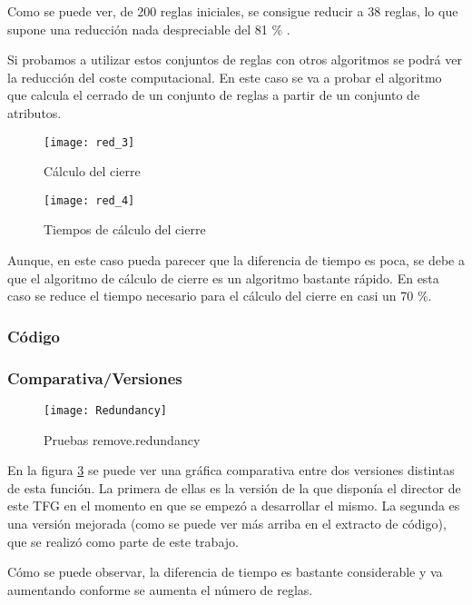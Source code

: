 Como se puede ver, de 200 reglas iniciales, se consigue reducir a 38 reglas, lo que supone una reducci\'on nada despreciable del 81 \% .

Si probamos a utilizar estos conjuntos de reglas con otros algoritmos se podr\'a ver la reducci\'on del coste computacional. En este caso se va a probar el algoritmo que calcula el cerrado de un conjunto de reglas a partir de un conjunto de atributos.

\begin{figure}[H]
    \centering
    \texttt{[image: red\_3]}
    \caption{C\'alculo del cierre}
    \label{fig:red_3}
\end{figure}

\begin{figure}[H]
    \centering
    \texttt{[image: red\_4]}
    \caption{Tiempos de c\'alculo del cierre}
    \label{fig:red_4}
\end{figure}

Aunque, en este caso pueda parecer que la diferencia de tiempo es poca, se debe a que el algoritmo de c\'alculo de cierre es un algoritmo bastante r\'apido. En esta caso se reduce el tiempo necesario para el c\'alculo del cierre en casi un 70 \%.

\newpage
\subsubsection{C\'odigo} 

\newpage
 
\subsubsection{Comparativa/Versiones} 
\begin{figure}[h]
    \centering
    \texttt{[image: Redundancy]}
    \caption{Pruebas remove.redundancy}
    \label{fig:redundancy}
\end{figure} 

En la figura \ref{fig:redundancy} se puede ver una gr\'afica comparativa entre dos versiones distintas de esta funci\'on. La primera de ellas es la versi\'on de la que dispon\'ia el director de este TFG en el momento en que se empez\'o a desarrollar el mismo. La segunda es una versi\'on mejorada (como se puede ver m\'as arriba en el extracto de c\'odigo), que se realiz\'o como parte de este trabajo.

C\'omo se puede observar, la diferencia de tiempo es bastante considerable y va aumentando conforme se aumenta el n\'umero de reglas.